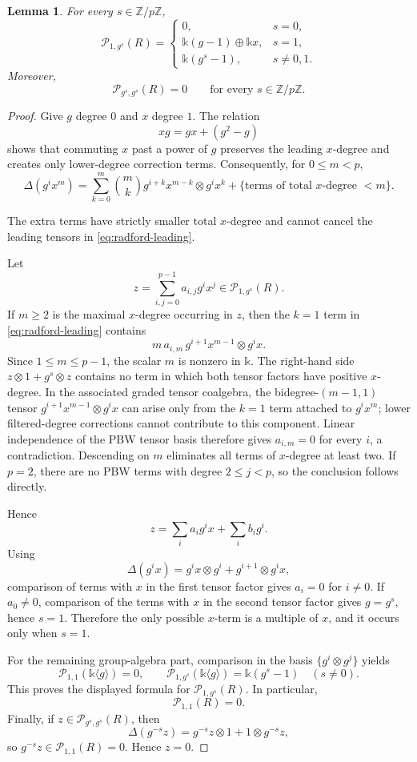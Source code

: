 \documentclass[twoside,11pt]{amsart}
\newtheorem{lem}[defi]{Lemma}
\newcommand{\K}{\mathds{k}}
\newcommand{\Z}{\mathbb{Z}}
\newcommand{\Pp}{\mathcal{P}}
\begin{document}
	\begin{lem}\label{lem:primitive-R}
		For every $s\in\Z/p\Z$,
		\[
		\Pp_{1,g^s}(R)=
		\begin{cases}
			0,&s=0,\\
			\K(g-1)\oplus\K x,&s=1,\\
			\K(g^s-1),&s\ne0,1.
		\end{cases}
		\]
		Moreover,
		\[
		\Pp_{g^s,g^s}(R)=0
		\qquad\text{for every }s\in\Z/p\Z.
		\]
	\end{lem}
	\begin{proof}
		Give $g$ degree $0$ and $x$ degree $1$. The relation
		\[
		xg=gx+(g^2-g)
		\]
		shows that commuting $x$ past a power of $g$ preserves the leading
		$x$-degree and creates only lower-degree correction terms. Consequently, for
		$0\le m<p$,
		\begin{equation}\label{eq:radford-leading}
			\Delta(g^ix^m)
			=\sum_{k=0}^{m}\binom{m}{k}
			g^{i+k}x^{m-k}\otimes g^ix^k
			+\{\text{terms of total $x$-degree $<m$}\}.
		\end{equation}
		
		The extra terms have strictly smaller total $x$-degree and cannot cancel
		the leading tensors in \eqref{eq:radford-leading}.
		
		Let
		\[
		z=\sum_{i,j=0}^{p-1}a_{i,j}g^ix^j\in\Pp_{1,g^s}(R).
		\]
		If $m\ge2$ is the maximal $x$-degree occurring in $z$, then the $k=1$ term
		in \eqref{eq:radford-leading} contains
		\[
		m\,a_{i,m}\,g^{i+1}x^{m-1}\otimes g^ix.
		\]
		Since $1\le m\le p-1$, the scalar $m$ is nonzero in $\K$. The right-hand
		side $z\otimes1+g^s\otimes z$ contains no term in which both tensor factors
		have positive $x$-degree. In the associated graded tensor coalgebra, the
		bidegree-$(m-1,1)$ tensor
		$g^{i+1}x^{m-1}\otimes g^ix$ can arise only from the $k=1$ term attached to
		$g^ix^m$; lower filtered-degree corrections cannot contribute to this
		component. Linear independence of the PBW tensor basis therefore gives
		$a_{i,m}=0$ for every $i$, a contradiction. Descending on $m$ eliminates
		all terms of $x$-degree at least two. If $p=2$, there are no
		PBW terms with degree $2\le j<p$, so the conclusion follows directly.
		
		Hence
		\[
		z=\sum_i a_i g^ix+\sum_i b_i g^i.
		\]
		Using
		\[
		\Delta(g^ix)=g^ix\otimes g^i+g^{i+1}\otimes g^ix,
		\]
		comparison of terms with $x$ in the first tensor factor gives $a_i=0$ for
		$i\ne0$. If $a_0\ne0$, comparison of the terms with $x$ in the second tensor
		factor gives $g=g^s$, hence $s=1$. Therefore the only possible $x$-term is a
		multiple of $x$, and it occurs only when $s=1$.
		
		For the remaining group-algebra part, comparison in the basis
		$\{g^i\otimes g^j\}$ yields
		\[
		\Pp_{1,1}(\K\langle g\rangle)=0,
		\qquad
		\Pp_{1,g^s}(\K\langle g\rangle)=\K(g^s-1)
		\quad(s\ne0).
		\]
		This proves the displayed formula for $\Pp_{1,g^s}(R)$. In particular,
		\[
		\Pp_{1,1}(R)=0.
		\]
		Finally, if $z\in\Pp_{g^s,g^s}(R)$, then
		\[
		\Delta(g^{-s}z)=g^{-s}z\otimes1+1\otimes g^{-s}z,
		\]
		so $g^{-s}z\in\Pp_{1,1}(R)=0$. Hence $z=0$.
	\end{proof}
	
\end{document}
